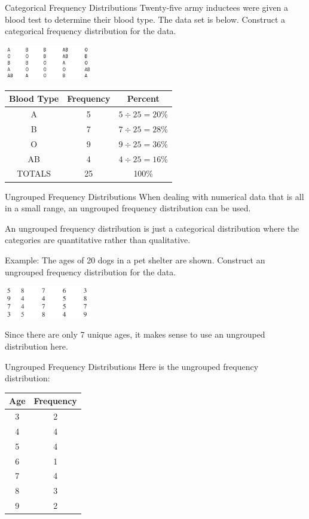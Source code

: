 \documentclass[t, aspectratio=169]{beamer}
\newcommand{\?}{\stackrel{?}{=}}
\begin{document}
	\begin{frame}{Categorical Frequency Distributions}
		Twenty-five army inductees were given a blood test to determine their blood type. The data set is below. Construct a categorical frequency distribution for the data. \pause
		
		\includegraphics[width=1.5in]{blood-types.png} \pause
		
		\begin{tabular}{c|c|c}
			Blood Type & Frequency & Percent \\ \hline
			A & 5 & $5 \div 25 = 20\%$ \\
			B & 7 & $7 \div 25 = 28\%$ \\
			O & 9 & $9 \div 25 = 36\%$ \\
			AB & 4 & $4 \div 25 = 16\%$ \\ \hline
			TOTALS & 25 & 100\%
		\end{tabular}
	\end{frame}

	\begin{frame}{Ungrouped Frequency Distributions}
		When dealing with numerical data that is all in a small range, an ungrouped frequency distribution can be used. \pause
		
		An ungrouped frequency distribution is just a categorical distribution where the categories are quantitative rather than qualitative. \pause
		
		Example: The ages of 20 dogs in a pet shelter are shown. Construct an ungrouped frequency distribution for the data. \pause
		
		\includegraphics[width=1.5in]{dog-ages.png} \pause
		
		Since there are only 7 unique ages, it makes sense to use an ungrouped distribution here.
	\end{frame}

	\begin{frame}{Ungrouped Frequency Distributions}
		Here is the ungrouped frequency distribution:
		
		\begin{tabular}{c|c}
			Age & Frequency \\ \hline
			3 & 2 \\
			4 & 4 \\
			5 & 4 \\
			6 & 1 \\
			7 & 4 \\
			8 & 3 \\
			9 & 2
		\end{tabular}
	\end{frame}
\end{document}
